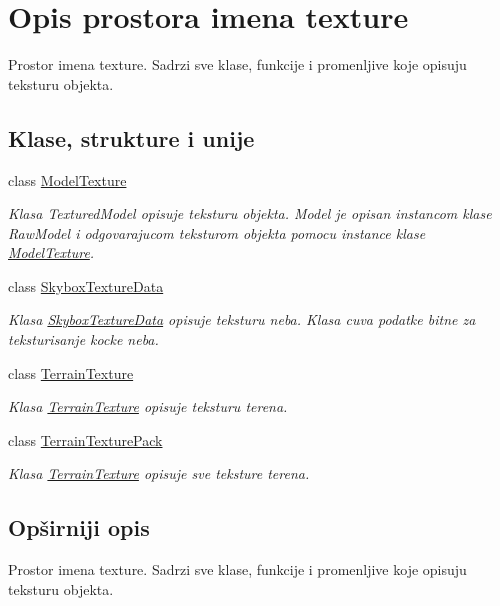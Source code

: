 \hypertarget{namespacetexture}{}\section{Opis prostora imena texture}
\label{namespacetexture}


Prostor imena texture. Sadrzi sve klase, funkcije i promenljive koje opisuju teksturu objekta.  


\subsection*{Klase, strukture i unije}
\begin{DoxyCompactItemize}
\item 
class \hyperlink{classtexture_1_1Texture}{Model\+Texture}
\begin{DoxyCompactList}\small\item\em Klasa Textured\+Model opisuje teksturu objekta. Model je opisan instancom klase Raw\+Model i odgovarajucom teksturom objekta pomocu instance klase \hyperlink{classtexture_1_1Texture}{Model\+Texture}. \end{DoxyCompactList}\item 
class \hyperlink{classtexture_1_1SkyboxTextureData}{Skybox\+Texture\+Data}
\begin{DoxyCompactList}\small\item\em Klasa \hyperlink{classtexture_1_1SkyboxTextureData}{Skybox\+Texture\+Data} opisuje teksturu neba. Klasa cuva podatke bitne za teksturisanje kocke neba. \end{DoxyCompactList}\item 
class \hyperlink{classtexture_1_1TerrainTexture}{Terrain\+Texture}
\begin{DoxyCompactList}\small\item\em Klasa \hyperlink{classtexture_1_1TerrainTexture}{Terrain\+Texture} opisuje teksturu terena. \end{DoxyCompactList}\item 
class \hyperlink{classtexture_1_1TerrainTexturePack}{Terrain\+Texture\+Pack}
\begin{DoxyCompactList}\small\item\em Klasa \hyperlink{classtexture_1_1TerrainTexture}{Terrain\+Texture} opisuje sve teksture terena. \end{DoxyCompactList}\end{DoxyCompactItemize}


\subsection{Opširniji opis}
Prostor imena texture. Sadrzi sve klase, funkcije i promenljive koje opisuju teksturu objekta. 